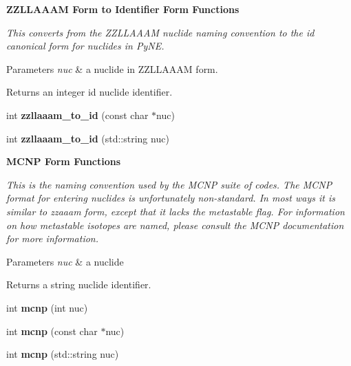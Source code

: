 \begin{Indent}\textbf{ Z\+Z\+L\+L\+A\+A\+AM Form to Identifier Form Functions}\par
{\em This converts from the Z\+Z\+L\+L\+A\+A\+AM nuclide naming convention to the id canonical form for nuclides in Py\+NE. 
\begin{DoxyParams}{Parameters}
{\em nuc} & a nuclide in Z\+Z\+L\+L\+A\+A\+AM form. \\
\hline
\end{DoxyParams}
\begin{DoxyReturn}{Returns}
an integer id nuclide identifier. 
\end{DoxyReturn}
}\begin{DoxyCompactItemize}
\item 
\mbox{\label{namespacepyne_1_1nucname_ad979606b90f315c2e9ef958818f96ad8}} 
int {\bfseries zzllaaam\+\_\+to\+\_\+id} (const char $\ast$nuc)
\item 
\mbox{\label{namespacepyne_1_1nucname_a55b0daddcb0ff68650685e50c015f960}} 
int {\bfseries zzllaaam\+\_\+to\+\_\+id} (std\+::string nuc)
\end{DoxyCompactItemize}
\end{Indent}
\begin{Indent}\textbf{ M\+C\+NP Form Functions}\par
{\em This is the naming convention used by the M\+C\+NP suite of codes. The M\+C\+NP format for entering nuclides is unfortunately non-\/standard. In most ways it is similar to zzaaam form, except that it lacks the metastable flag. For information on how metastable isotopes are named, please consult the M\+C\+NP documentation for more information. 
\begin{DoxyParams}{Parameters}
{\em nuc} & a nuclide \\
\hline
\end{DoxyParams}
\begin{DoxyReturn}{Returns}
a string nuclide identifier. 
\end{DoxyReturn}
}\begin{DoxyCompactItemize}
\item 
\mbox{\label{namespacepyne_1_1nucname_a9b336037f24de5fb0a9f24bc6324cd40}} 
int {\bfseries mcnp} (int nuc)
\item 
\mbox{\label{namespacepyne_1_1nucname_aa2134eda4b5151d6299fd682122d89e3}} 
int {\bfseries mcnp} (const char $\ast$nuc)
\item 
\mbox{\label{namespacepyne_1_1nucname_a3e05db49bed60a40e56a1798afcd33ea}} 
int {\bfseries mcnp} (std\+::string nuc)
\end{DoxyCompactItemize}
\end{Indent}
